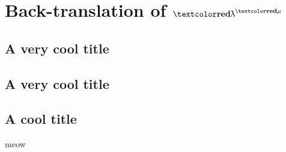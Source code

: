 \documentclass{article}
\begin{document}
\begin{smathpar}

  \sx

  \se

  \sv

  \svtwo

  \salpha

  \stypr[4]

  \sfunty{\styone}{\stytwo}

  \sfune{\sx}{\sty}{\seone}

  \sboolty

  \tfune{\tx}{\ttyone}{\teone}



  \acasee{\ae}{\ax}{\aeone}{\ay}{\aetwo}

\end{smathpar}

\renewcommand{\tlang}{\tfont{\uplambda}^{\tfont{\mu}}}
\section[Back-Translation]{Back-translation of $\tlang$}
\subsection{A very cool title}
\subsection{A very cool title}
\subsection{A cool title}


meow
\end{document}

